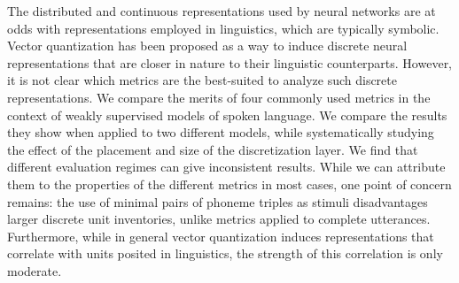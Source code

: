 The distributed and continuous representations used by neural networks are at odds with representations employed in linguistics, which are typically symbolic. Vector quantization has been proposed as a way to induce discrete neural representations that are closer in nature to their linguistic counterparts. However, it is not clear which metrics are the best-suited to analyze such discrete representations. We compare the merits of four commonly used metrics in the context of weakly supervised models of spoken language.  We compare the results they show when applied to two different models, while systematically studying the effect of the placement and size of the discretization layer.  We find that different evaluation regimes can give inconsistent results. While we can attribute them to the properties of the different metrics in most cases, one point of concern remains: the use of minimal pairs of phoneme triples as stimuli disadvantages larger discrete unit inventories, unlike metrics applied to complete utterances. Furthermore, while in general vector quantization induces representations that correlate with units posited in linguistics, the strength of this correlation is only moderate.

